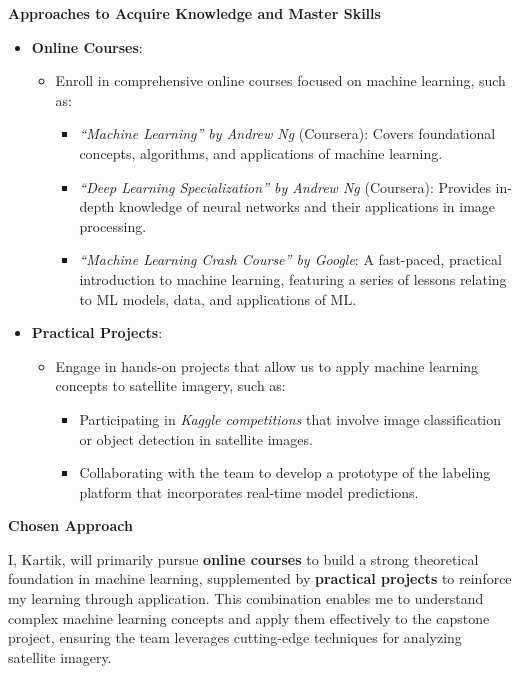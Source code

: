 \documentclass[12pt]{article}
\begin{document}
\textbf{Approaches to Acquire Knowledge and Master Skills}

\begin{itemize}
    \item \textbf{Online Courses}:
    \begin{itemize}
        \item Enroll in comprehensive online courses focused on machine learning, such as:
        \begin{itemize}
            \item \textit{“Machine Learning” by Andrew Ng} (Coursera): Covers foundational concepts, algorithms, and applications of machine learning.
            \item \textit{“Deep Learning Specialization” by Andrew Ng} (Coursera): Provides in-depth knowledge of neural networks and their applications in image processing.
            \item \textit{“Machine Learning Crash Course” by Google}: A fast-paced, practical introduction to machine learning, featuring a series of lessons relating to ML models, data, and applications of ML.
        \end{itemize}
    \end{itemize}
    
    \item \textbf{Practical Projects}:
    \begin{itemize}
        \item Engage in hands-on projects that allow us to apply machine learning concepts to satellite imagery, such as:
        \begin{itemize}
            \item Participating in \textit{Kaggle competitions} that involve image classification or object detection in satellite images.
            \item Collaborating with the team to develop a prototype of the labeling platform that incorporates real-time model predictions.
        \end{itemize}
    \end{itemize}
\end{itemize}

\textbf{Chosen Approach}

I, Kartik, will primarily pursue \textbf{online courses} to build a strong theoretical foundation in machine learning, supplemented by \textbf{practical projects} to reinforce my learning through application. This combination enables me to understand complex machine learning concepts and apply them effectively to the capstone project, ensuring the team leverages cutting-edge techniques for analyzing satellite imagery.
\end{document}
